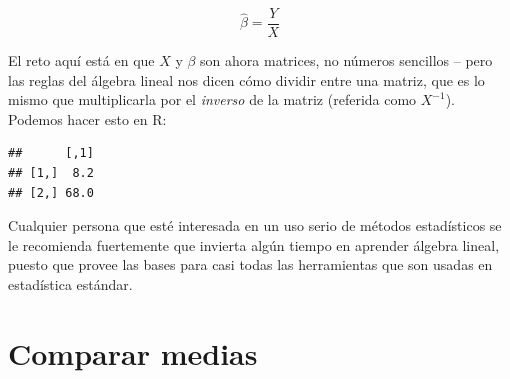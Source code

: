\documentclass[
  12pt,
]{book}
\newenvironment{Shaded}{\begin{snugshade}}{\end{snugshade}}
\newcommand{\AttributeTok}[1]{\textcolor[rgb]{0.77,0.63,0.00}{#1}}
\newcommand{\CommentTok}[1]{\textcolor[rgb]{0.56,0.35,0.01}{\textit{#1}}}
\newcommand{\DecValTok}[1]{\textcolor[rgb]{0.00,0.00,0.81}{#1}}
\newcommand{\FunctionTok}[1]{\textcolor[rgb]{0.00,0.00,0.00}{#1}}
\newcommand{\NormalTok}[1]{#1}
\newcommand{\OtherTok}[1]{\textcolor[rgb]{0.56,0.35,0.01}{#1}}
\newcommand{\SpecialCharTok}[1]{\textcolor[rgb]{0.00,0.00,0.00}{#1}}
\theoremstyle{definition}
\theoremstyle{definition}
\theoremstyle{definition}
\theoremstyle{remark}
\begin{document}
\[
\hat{\beta} = \frac{Y}{X}
\]

El reto aquí está en que \(X\) y \(\beta\) son ahora matrices, no números sencillos -- pero las reglas del álgebra lineal nos dicen cómo dividir entre una matriz, que es lo mismo que multiplicarla por el \emph{inverso} de la matriz (referida como \(X^{-1}\)). Podemos hacer esto en R:

\begin{Shaded}
\end{Shaded}

\begin{verbatim}
##      [,1]
## [1,]  8.2
## [2,] 68.0
\end{verbatim}

Cualquier persona que esté interesada en un uso serio de métodos estadísticos se le recomienda fuertemente que invierta algún tiempo en aprender álgebra lineal, puesto que provee las bases para casi todas las herramientas que son usadas en estadística estándar.

\hypertarget{comparar-medias}{%
\chapter{Comparar medias}\label{comparar-medias}}
\end{document}
